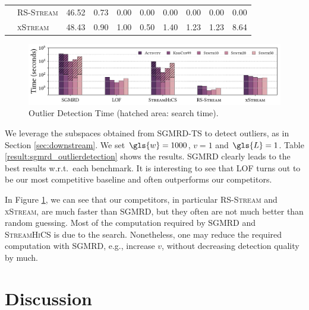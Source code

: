 \begin{table}[]
\begin{tabularx}{\textwidth}{@{}XXllllllll@{}}
		& \textsc{\gls{RS-Stream}}      & 46.52          & 0.73           & 0.00           & 0.00           & 0.00           & 0.00           & 0.00           & 0.00           \\
		& \textsc{xStream}        & 48.43          & 0.90           & 1.00           & 0.50           & 1.40           & 1.23           & 1.23           & 8.64           \\ \bottomrule
	\end{tabularx}
\end{table} 

\begin{figure}
	\includegraphics[width=\linewidth]{part4-figures/runtime-2-2-compressed.pdf}
	\caption{Outlier Detection Time (hatched area: search time).} 
	\label{fig:SGMRD_OutlierDetectionRuntime}
\end{figure} 

We leverage the subspaces obtained from \textsc{\gls{SGMRD}-\gls{TS}} to detect outliers, as in Section \ref{sec:downstream}. We set $\gls{w}=1000$, $v=1$ and $\gls{L}=1$. Table \ref{result:sgmrd_outlierdetection} shows the results. \textsc{\gls{SGMRD}} clearly leads to the best results w.r.t.\ each benchmark. It is interesting to see that \gls{LOF} turns out to be our most competitive baseline and often outperforms our competitors. 

In Figure \ref{fig:SGMRD_OutlierDetectionRuntime}, we can see that our competitors, in particular \textsc{\acrshort{RS-Stream}} and \textsc{xStream}, are much faster than \textsc{\gls{SGMRD}}, but they often are not much better than random guessing. 
Most of the computation required by \textsc{\gls{SGMRD}} and \textsc{Stream\acrshort{HiCS}} is due to the search. 
Nonetheless, one may reduce the required computation with \textsc{\gls{SGMRD}}, e.g., increase $v$, without decreasing detection quality by much. 


\section{Discussion}

